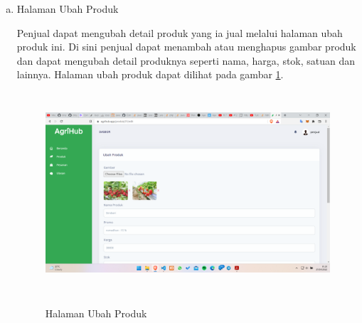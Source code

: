 \begin{enumerate}
\begin{enumerate}[a.]
		\item Halaman Ubah Produk
		\par Penjual dapat mengubah detail produk yang ia jual melalui halaman ubah produk ini. Di sini penjual dapat menambah atau menghapus gambar produk dan dapat mengubah detail produknya seperti nama, harga, stok, satuan dan lainnya. Halaman ubah produk dapat dilihat pada gambar \ref*{ubah_produk}.
		\begin{figure}[H]
			\centering
			{\includegraphics [width = 13cm, height= 7.5cm]{gambar/penjual/ubah_produk}}
			\caption{Halaman Ubah Produk}
			\label{ubah_produk}
		\end{figure}


\end{enumerate}
\end{enumerate}
